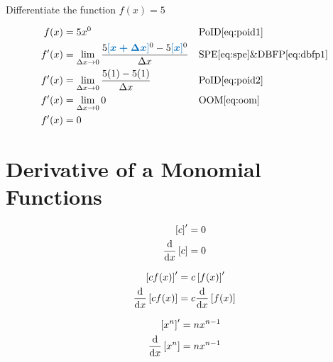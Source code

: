 \begin{example}[id:20141219-212546] \label{20141219-212546} \hfill \\

Differentiate the function $f(x)=5$

\soln

\solnsteps
\begin{align*}
f(x) & = 5x^0 && \text{PoID} \eqref{eq:poid1} \\
f'(x) &= \displaystyle \lim_{\Delta x \to 0} \dfrac{5\farg{x+\Delta x}^0-5\farg{x}^0}{\Delta x} && \text{SPE} \eqref{eq:spe} \& \text{DBFP} \eqref{eq:dbfp1}\\
f'(x) &= \displaystyle \lim_{\Delta x \to 0} \dfrac {5(1)-5(1)}{\Delta x} && \text{PoID} \eqref{eq:poid2} \\
f'(x) &= \displaystyle \lim_{\Delta x \to 0} 0 && \text{OOM} \eqref{eq:oom} \\
f'(x) &= 0 %
\end{align*}

\end{example}

\section{Derivative of a Monomial Functions}

\begin{arule}
\begin{align}
	\left[c \right]' &= 0 \label{eq:dc1} \\
	\dfrac{\mathrm{d}}{\mathrm{d}x} \left[c \right]&=0  \label{eq:dc2}
\end{align}
\end{arule}

\begin{arule}
\begin{align}
	\left[c f(x) \right]' &= c \left[f(x)\right]' \label{eq:dcm1} \\
	\dfrac{\mathrm{d}}{\mathrm{d}x}\left[c f(x) \right] &= c \dfrac{\mathrm{d}}{\mathrm{d}x}\left[f(x)\right]  \label{eq:dcm2}
\end{align}
\end{arule}

\begin{arule}
\begin{align}
	\left[x^n \right]'&= n x^{n-1} \label{eq:dpo1} \\
	\dfrac{\mathrm{d}}{\mathrm{d}x} \left[x^n \right] &= n x^{n-1}  \label{eq:dpo2}
\end{align}
\end{arule}

